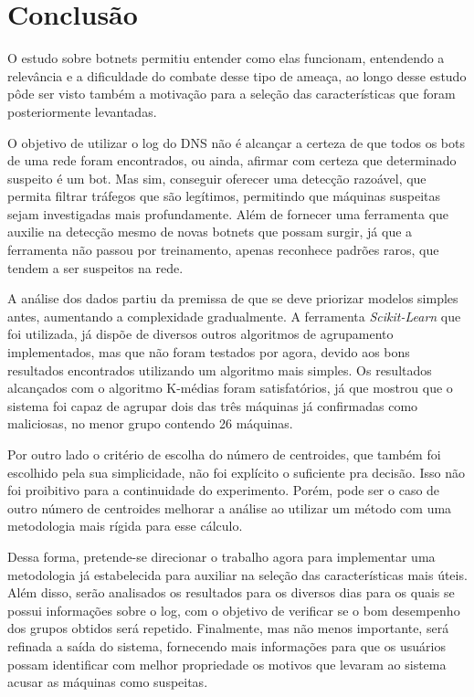 \chapter{Conclusão}
O estudo sobre botnets permitiu entender como elas funcionam, entendendo a relevância e a dificuldade do combate desse tipo de ameaça, ao longo desse estudo pôde ser visto também a motivação para a seleção das características que foram posteriormente levantadas.

O objetivo de utilizar o log do DNS não é alcançar a certeza de que todos os bots de uma rede foram encontrados, ou ainda, afirmar com certeza que determinado suspeito é um bot. Mas sim, conseguir oferecer uma detecção razoável, que permita filtrar tráfegos que são legítimos, permitindo que máquinas suspeitas sejam investigadas mais profundamente. Além de fornecer uma ferramenta que auxilie na detecção mesmo de novas botnets que possam surgir, já que a ferramenta não passou por treinamento, apenas reconhece padrões raros, que tendem a ser suspeitos na rede.

A análise dos dados partiu da premissa de que se deve priorizar modelos simples antes, aumentando a complexidade gradualmente. A ferramenta \textit{Scikit-Learn} que foi utilizada, já dispõe de diversos outros algoritmos de agrupamento implementados, mas que não foram testados por agora, devido aos bons resultados encontrados utilizando um algoritmo mais simples. Os resultados alcançados com o algoritmo K-médias foram satisfatórios, já que mostrou que o sistema foi capaz de agrupar dois das três máquinas já confirmadas como maliciosas, no menor grupo contendo 26 máquinas.

Por outro lado o critério de escolha do número de centroides, que também foi escolhido pela sua simplicidade, não foi explícito o suficiente pra decisão. Isso não foi proibitivo para a continuidade do experimento. Porém, pode ser o caso de outro número de centroides melhorar a análise ao utilizar um método com uma metodologia mais rígida para esse cálculo.

Dessa forma, pretende-se direcionar o trabalho agora para implementar uma metodologia já estabelecida para auxiliar na seleção das características mais úteis. Além disso, serão analisados os resultados para os diversos dias para os quais se possui informações sobre o log, com o objetivo de verificar se o bom desempenho dos grupos obtidos será repetido. Finalmente, mas não menos importante, será refinada a saída do sistema, fornecendo mais informações para que os usuários possam identificar com melhor propriedade os motivos que levaram ao sistema acusar as máquinas como suspeitas.